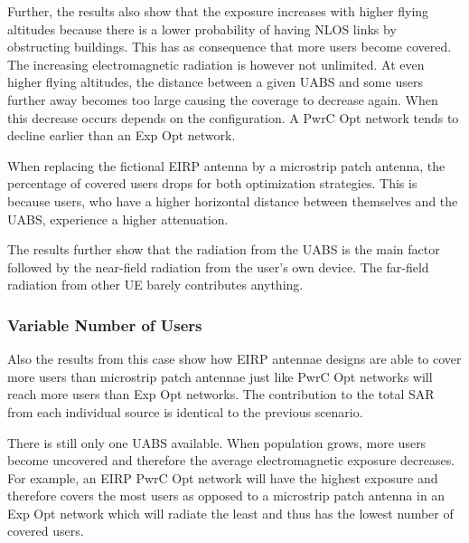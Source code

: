 \documentclass[twocolumn]{phdsymp} %
\begin{document}
Further, the results also show that the exposure increases with higher flying altitudes
because there is a lower probability of having \gls{NLOS} links by obstructing buildings. This has as consequence that  
more users become covered. 
The increasing electromagnetic radiation is however not unlimited.
At even higher
flying altitudes, the distance between a given \gls{UABS} and some users further away becomes too large causing the 
coverage to decrease again. When this decrease occurs depends on the configuration. A \gls{PwrC Opt} 
network tends to decline earlier than an \gls{Exp Opt} network.

When replacing the fictional \gls{EIRP} antenna by a microstrip patch antenna, the percentage of covered users drops for both 
optimization strategies. This is because users, who have a higher horizontal distance between themselves and the \gls{UABS}, 
experience a higher attenuation.

The results further show  
that the radiation from the \gls{UABS} is the main factor followed by the near-field radiation from the user's own device.
The far-field radiation from other \gls{UE} barely contributes anything.

\subsubsection{Variable Number of Users}

Also the results from this case show how EIRP antennae designs are able to cover more users than microstrip patch antennae
just like \gls{PwrC Opt} networks will reach more users than \gls{Exp Opt} networks.
The contribution to the total \gls{SAR} from each individual source is identical to the previous scenario. 

There is still only one \gls{UABS} available. When population grows, more users become uncovered and 
therefore the average electromagnetic exposure decreases.
For example, an EIRP \gls{PwrC Opt} network
will have the highest exposure and therefore covers the most users as opposed to a microstrip patch antenna in 
an \gls{Exp Opt} network which will radiate the least and thus has the lowest number of covered users.
\end{document}
